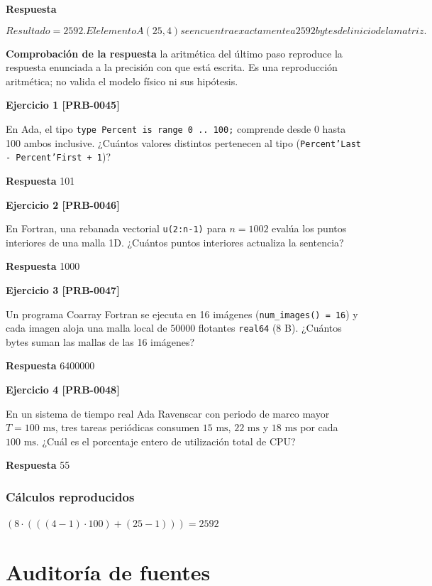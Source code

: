 \documentclass{book}
\begin{document}
\noindent\textbf{Respuesta}

\[
Resultado = 2592. El elemento A(25, 4) se encuentra exactamente a 2592 bytes del inicio de la matriz.
\]

\noindent\textbf{Comprobación de la respuesta} la aritmética del último paso reproduce la respuesta enunciada a la precisión con que está escrita. Es una reproducción aritmética; no valida el modelo físico ni sus hipótesis.

\noindent\textbf{Ejercicio 1 [PRB-0045]}

En Ada, el tipo \texttt{type Percent is range 0 .. 100;} comprende desde 0 hasta 100 ambos inclusive. ¿Cuántos valores distintos pertenecen al tipo (\texttt{Percent'Last - Percent'First + 1})?

\noindent\textbf{Respuesta} 101

\noindent\textbf{Ejercicio 2 [PRB-0046]}

En Fortran, una rebanada vectorial \texttt{u(2:n-1)} para \(n = 1002\) evalúa los puntos interiores de una malla 1D. ¿Cuántos puntos interiores actualiza la sentencia?

\noindent\textbf{Respuesta} 1000

\noindent\textbf{Ejercicio 3 [PRB-0047]}

Un programa Coarray Fortran se ejecuta en 16 imágenes (\texttt{num\_images() = 16}) y cada imagen aloja una malla local de \(50000\) flotantes \texttt{real64} (8 B). ¿Cuántos bytes suman las mallas de las 16 imágenes?

\noindent\textbf{Respuesta} 6400000

\noindent\textbf{Ejercicio 4 [PRB-0048]}

En un sistema de tiempo real Ada Ravenscar con periodo de marco mayor \(T = 100\text{ ms}\), tres tareas periódicas consumen \(15\text{ ms}\), \(22\text{ ms}\) y \(18\text{ ms}\) por cada \(100\text{ ms}\). ¿Cuál es el porcentaje entero de utilización total de CPU?

\noindent\textbf{Respuesta} 55

\subsection*{Cálculos reproducidos}

\(\left(8\cdot \left(\left(\left(4-1\right)\cdot 100\right)+\left(25-1\right)\right)\right) = 2592\)
\chapter{Auditoría de fuentes}
\end{document}
